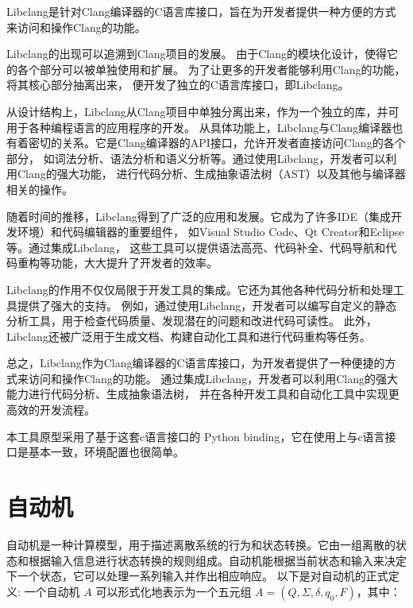Libclang是针对Clang编译器的C语言库接口，旨在为开发者提供一种方便的方式来访问和操作Clang的功能。

Libclang的出现可以追溯到Clang项目的发展。
由于Clang的模块化设计，使得它的各个部分可以被单独使用和扩展。
为了让更多的开发者能够利用Clang的功能，将其核心部分抽离出来，
便开发了独立的C语言库接口，即Libclang。

从设计结构上，Libclang从Clang项目中单独分离出来，作为一个独立的库，并可用于各种编程语言的应用程序的开发。
从具体功能上，Libclang与Clang编译器也有着密切的关系。它是Clang编译器的API接口，允许开发者直接访问Clang的各个部分，
如词法分析、语法分析和语义分析等。通过使用Libclang，开发者可以利用Clang的强大功能，
进行代码分析、生成抽象语法树（AST）以及其他与编译器相关的操作。

随着时间的推移，Libclang得到了广泛的应用和发展。它成为了许多IDE（集成开发环境）和代码编辑器的重要组件，
如Visual Studio Code、Qt Creator和Eclipse等。通过集成Libclang，
这些工具可以提供语法高亮、代码补全、代码导航和代码重构等功能，大大提升了开发者的效率。

Libclang的作用不仅仅局限于开发工具的集成。它还为其他各种代码分析和处理工具提供了强大的支持。
例如，通过使用Libclang，开发者可以编写自定义的静态分析工具，用于检查代码质量、发现潜在的问题和改进代码可读性。
此外，Libclang还被广泛用于生成文档、构建自动化工具和进行代码重构等任务。

总之，Libclang作为Clang编译器的C语言库接口，为开发者提供了一种便捷的方式来访问和操作Clang的功能。
通过集成Libclang，开发者可以利用Clang的强大能力进行代码分析、生成抽象语法树，
并在各种开发工具和自动化工具中实现更高效的开发流程。

本工具原型采用了基于这套c语言接口的 Python binding，它在使用上与c语言接口是基本一致，环境配置也很简单。
\section{自动机}
自动机是一种计算模型，用于描述离散系统的行为和状态转换。它由一组离散的状态和根据输入信息进行状态转换的规则组成。自动机能根据当前状态和输入来决定下一个状态，它可以处理一系列输入并作出相应响应。
以下是对自动机的正式定义\cite{hopcroft2006}:
一个自动机 \( A \) 可以形式化地表示为一个五元组 \( A = (Q, \Sigma, \delta, q_0, F) \)，其中：

